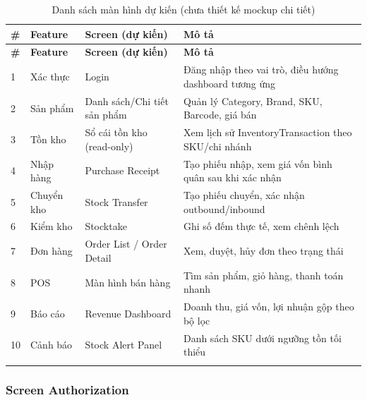 \begin{longtable}{|p{0.6cm}|p{3.2cm}|p{3.2cm}|p{6.5cm}|}
    \hline
    \textbf{\#} & \textbf{Feature} & \textbf{Screen (dự kiến)} & \textbf{Mô tả} \\
    \hline
    \endfirsthead
    \hline
    \textbf{\#} & \textbf{Feature} & \textbf{Screen (dự kiến)} & \textbf{Mô tả} \\
    \hline
    \endhead
    1 & Xác thực & Login & Đăng nhập theo vai trò, điều hướng dashboard tương ứng \\
    \hline
    2 & Sản phẩm & Danh sách/Chi tiết sản phẩm & Quản lý Category, Brand, SKU, Barcode, giá bán \\
    \hline
    3 & Tồn kho & Sổ cái tồn kho (read-only) & Xem lịch sử InventoryTransaction theo SKU/chi nhánh \\
    \hline
    4 & Nhập hàng & Purchase Receipt & Tạo phiếu nhập, xem giá vốn bình quân sau khi xác nhận \\
    \hline
    5 & Chuyển kho & Stock Transfer & Tạo phiếu chuyển, xác nhận outbound/inbound \\
    \hline
    6 & Kiểm kho & Stocktake & Ghi số đếm thực tế, xem chênh lệch \\
    \hline
    7 & Đơn hàng & Order List / Order Detail & Xem, duyệt, hủy đơn theo trạng thái \\
    \hline
    8 & POS & Màn hình bán hàng & Tìm sản phẩm, giỏ hàng, thanh toán nhanh \\
    \hline
    9 & Báo cáo & Revenue Dashboard & Doanh thu, giá vốn, lợi nhuận gộp theo bộ lọc \\
    \hline
    10 & Cảnh báo & Stock Alert Panel & Danh sách SKU dưới ngưỡng tồn tối thiểu \\
    \hline
    \caption{Danh sách màn hình dự kiến (chưa thiết kế mockup chi tiết)}
    \label{tab:screen-overview}
\end{longtable}

\subsubsection{Screen Authorization}


